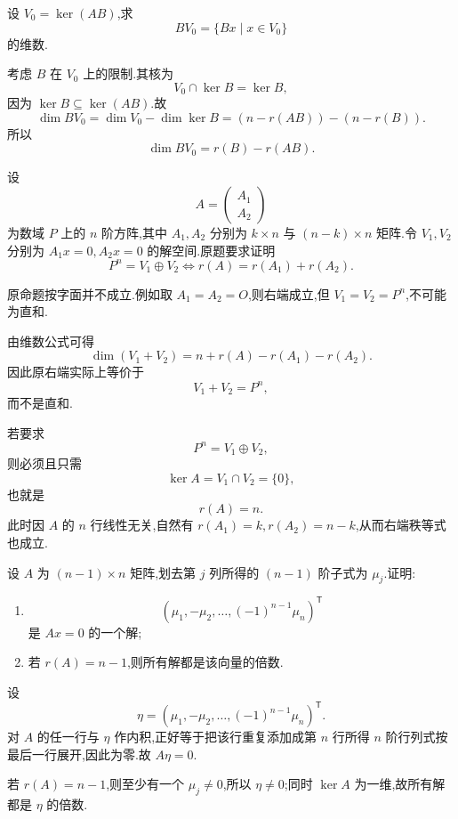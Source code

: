 \begin{example}
设 $V_0=\ker(AB)$,求
\[
BV_0=\{Bx\mid x\in V_0\}
\]
的维数.
\end{example}
\exampleblank

\begin{solution}
考虑 $B$ 在 $V_0$ 上的限制.其核为
\[
V_0\cap\ker B=\ker B,
\]
因为 $\ker B\subseteq\ker(AB)$.故
\[
\dim BV_0
=\dim V_0-\dim\ker B
=(n-r(AB))-(n-r(B)).
\]
所以
\[
\boxed{\dim BV_0=r(B)-r(AB)}.
\]
\end{solution}

\begin{example}
设
\[
A=\begin{pmatrix}A_1\\A_2\end{pmatrix}
\]
为数域 $P$ 上的 $n$ 阶方阵,其中 $A_1,A_2$ 分别为 $k\times n$ 与 $(n-k)\times n$ 矩阵.令 $V_1,V_2$ 分别为 $A_1x=0,A_2x=0$ 的解空间.原题要求证明
\[
P^n=V_1\oplus V_2
\iff
r(A)=r(A_1)+r(A_2).
\]
\end{example}
\exampleblank

\begin{solution}
原命题按字面并不成立.例如取 $A_1=A_2=O$,则右端成立,但 $V_1=V_2=P^n$,不可能为直和.

由维数公式可得
\[
\dim(V_1+V_2)
=n+r(A)-r(A_1)-r(A_2).
\]
因此原右端实际上等价于
\[
V_1+V_2=P^n,
\]
而不是直和.

若要求
\[
P^n=V_1\oplus V_2,
\]
则必须且只需
\[
\ker A=V_1\cap V_2=\{0\},
\]
也就是
\[
\boxed{r(A)=n}.
\]
此时因 $A$ 的 $n$ 行线性无关,自然有 $r(A_1)=k,r(A_2)=n-k$,从而右端秩等式也成立.
\end{solution}

\begin{example}
设 $A$ 为 $(n-1)\times n$ 矩阵,划去第 $j$ 列所得的 $(n-1)$ 阶子式为 $\mu_j$.证明:
\begin{enumerate}
  \item
  \[
  (\mu_1,-\mu_2,\ldots,(-1)^{n-1}\mu_n)^{\mathsf T}
  \]
  是 $Ax=0$ 的一个解;
  \item 若 $r(A)=n-1$,则所有解都是该向量的倍数.
\end{enumerate}
\end{example}
\exampleblank

\begin{solution}
设
\[
\eta=(\mu_1,-\mu_2,\ldots,(-1)^{n-1}\mu_n)^{\mathsf T}.
\]
对 $A$ 的任一行与 $\eta$ 作内积,正好等于把该行重复添加成第 $n$ 行所得 $n$ 阶行列式按最后一行展开,因此为零.故 $A\eta=0$.

若 $r(A)=n-1$,则至少有一个 $\mu_j\neq0$,所以 $\eta\neq0$;同时 $\ker A$ 为一维,故所有解都是 $\eta$ 的倍数.
\end{solution}

